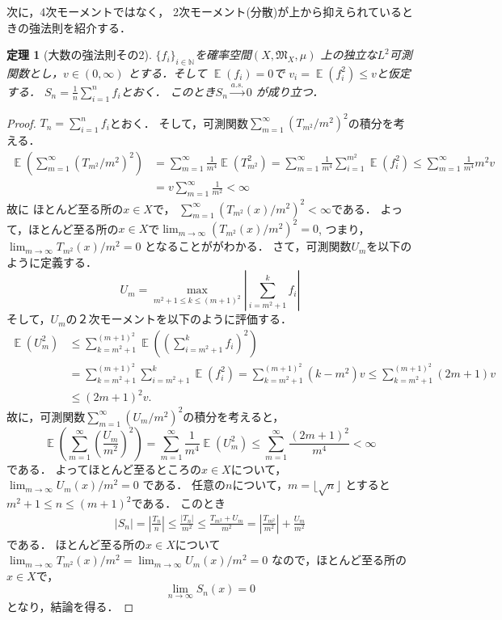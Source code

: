 \documentclass[leqno, a4paper, 12pt]{jsarticle}
\newtheorem{thm}{定理}
\newcommand{\nn}{\mathbb{N}}
\DeclareMathOperator{\mean}{\mathbb{E}}
\begin{document}
次に，4次モーメントではなく，
2次モーメント(分散)が上から抑えられているときの強法則を紹介する．
\begin{thm}[大数の強法則その2]\label{thm:strlaw2}
$\{f_i\}_{i\in \nn}$を確率空間$(X, \mathfrak{M}_X, \mu)$
上の独立な$L^2$可測関数とし，$v\in (0, \infty)$
とする．そして
$\mean(f_i)=0$で
$v_i=\mean(f_i^2)\le v$と仮定する．
$S_n=\frac{1}{n}\sum_{i=1}^nf_{i}$とおく．
このとき$S_n\xrightarrow{a. s. }0$
が成り立つ．
\end{thm}
\begin{proof}
$T_n=\sum_{i=1}^nf_i$とおく．
そして，可測関数$\sum_{m=1}^{\infty}(T_{m^2}/m^2)^2$の積分を考える．
\begin{align*}
\mean\left(\sum_{m=1}^{\infty}(T_{m^2}/m^2)^2\right)
&=\sum_{m=1}^{\infty}\frac{1}{m^4}
\mean(T_{m^2}^2)=
\sum_{m=1}^{\infty}\frac{1}{m^4}\sum_{i=1}^{m^2}\mean(f_i^2)\le 
\sum_{m=1}^{\infty}\frac{1}{m^4}m^2v\\
&=v\sum_{m=1}^{\infty}\frac{1}{m^2}<\infty
\end{align*}
故に
ほとんど至る所の$x\in X$で，
$\sum_{m=1}^{\infty}(T_{m^2}(x)/m^2)^2<\infty$である．
よって，ほとんど至る所の$x\in X$で$\lim_{m\to \infty}(T_{m^2}(x)/m^2)^2=0$, 
つまり，
$\lim_{m\to \infty}T_{m^2}(x)/m^2=0$
となることががわかる．
さて，可測関数$U_m$を以下のように定義する．
\[
U_m=\max_{m^2+1\le k\le (m+1)^2}\left|\sum_{i=m^2+1}^kf_i\right|
\]
そして，$U_m$の２次モーメントを以下のように評価する．
\begin{align*}
\mean(U_m^2)
&\le
\sum_{k=m^2+1}^{(m+1)^2}
\mean
\left(\left(\sum_{i=m^2+1}^kf_{i}\right)^2\right)\\
&=
\sum_{k=m^2+1}^{(m+1)^2}\sum_{i=m^2+1}^k\mean(f_i^2)
=\sum_{k=m^2+1}^{(m+1)^2}(k-m^2)v
\le 
\sum_{k=m^2+1}^{(m+1)^2}(2m+1)v\\
&\le (2m+1)^2v.
\end{align*}
故に，可測関数$\sum_{m=1}^{\infty}(U_m/m^2)^2$の積分を考えると，
\[
\mean\left(\sum_{m=1}^{\infty}
\left(\frac{U_m}{m^2}\right)^2\right)
= \sum_{m=1}^{\infty}\frac{1}{m^4}\mean(U_m^2)\le 
\sum_{m=1}^{\infty}\frac{(2m+1)^2}{m^4}<\infty
\]
である．
よってほとんど至るところの$x\in X$について，
$\lim_{m\to \infty}U_m(x)/m^2=0$
である．
任意の$n$について，$m=\lfloor \sqrt{n}\rfloor$
とすると$m^2+1\le n\le (m+1)^2$である．
このとき
\begin{align*}
\left|S_n\right|=\left|\frac{T_n}{n}\right|\le \frac{|T_n|}{m^2}\le 
\frac{T_{m^2}+U_m}{m^2}=\left|\frac{T_{m^2}}{m^2}\right|+\frac{U_m}{m^2}
\end{align*}
である．
ほとんど至る所の$x\in X$について
$\lim_{m\to \infty}T_{m^2}(x)/m^2=\lim_{m\to \infty}U_m(x)/m^2=0$
なので，ほとんど至る所の$x\in X$で，
\[
\lim_{n\to \infty}S_{n}(x)=0
\]
となり，結論を得る．
\end{proof}
\end{document}

